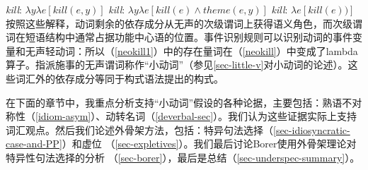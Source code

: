 \eal
\label{neokill}\settowidth{}
\ex \emph{kill}: $\lambda y\lambda e[kill(e, y)]$                         
\ex \emph{kill}: $\lambda y\lambda e[kill(e) \wedge theme(e, y)]$ 
\ex \emph{kill}: $\lambda e[kill(e))]$                                  
\zl
按照这些解释，动词剩余的依存成分从无声的次级谓词上获得语义角色，而次级谓词在短语结构中通常占据功能中心语的位置。事件识别规则可以识别动词的事件变量和无声轻动词\citep[]{Kratzer96a}：所以（\ref{neokill1}）中的存在量词在（\ref{neokill}）中变成了lambda算子。指派施事的无声谓词称作“小动词”（参见\ref{sec-little-v}对小动词的论述）。这些词汇外的依存成分等同于构式语法提出的构式。

在下面的章节中，我重点分析支持“小动词”假设的各种论据，主要包括：熟语不对称性（\ref{idiom-asym}）、动转名词（\ref{deverbal-sec}）。我们认为这些证据实际上支持词汇观点。然后我们论述外骨架方法，包括：特异句法选择（\ref{sec-idiosyncratic-case-and-PP}）和虚位 （\ref{sec-expletives}）。我们最后讨论Borer使用外骨架理论对特异性句法选择的分析 （\ref{sec-borer}），最后是总结（\ref{sec-underspec-summary}）。

